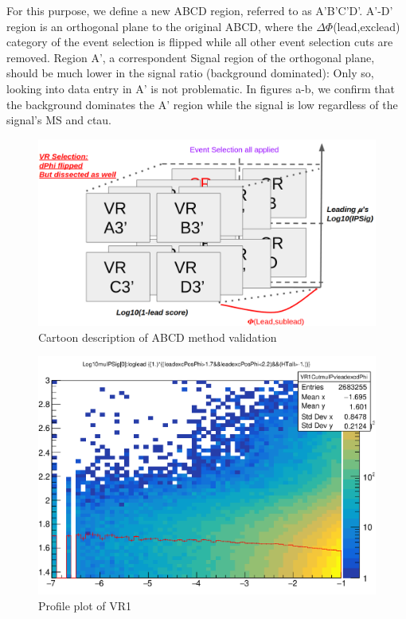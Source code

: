 For this purpose, we define a new ABCD region, referred to as A'B'C'D'.
A'-D' region is an orthogonal plane to the original ABCD, where the $\Delta\Phi$(lead,exclead) category of the event selection is flipped while all other event selection cuts are removed.
Region A', a correspondent Signal region of the orthogonal plane, should be much lower in the signal ratio (background dominated): Only so, looking into data entry in A' is not problematic.
In figures a-b, we confirm that the background dominates the A' region while the signal is low regardless of the signal's MS and ctau.

\begin{figure}[h!]
  \caption{Cartoon description of ABCD method validation}
  \label{fig:valcar}
  \centering
  \includegraphics[width=0.85\linewidth]{figs/Valcart.png}

\end{figure}


\begin{figure}[h!]
  \caption{Profile plot of VR1}
  \label{fig:valcar2}
  \centering
  \includegraphics[width=0.65\linewidth]{figs/VR1.png}

\end{figure}

